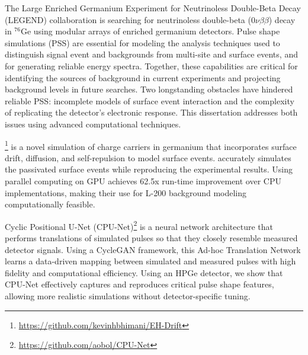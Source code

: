 The Large Enriched Germanium Experiment for Neutrinoless Double-Beta Decay (LEGEND) collaboration is searching for neutrinoless double-beta ({\ensuremath{0\nu\beta\beta}}) decay in ${}^{76}$Ge using modular arrays of enriched germanium detectors. Pulse shape simulations (PSS) are essential for modeling the analysis techniques used to distinguish signal event and backgrounds from multi-site and surface events, and for generating reliable energy spectra. Together, these capabilities are critical for identifying the sources of background in current experiments and projecting background levels in future searches. Two longstanding obstacles have hindered reliable PSS: incomplete models of surface event interaction and the complexity of replicating the detector’s electronic response. This dissertation addresses both issues using advanced computational techniques.

{\ehd} \footnote{\url{https://github.com/kevinhbhimani/EH-Drift}} is a novel simulation of charge carriers in germanium that incorporates surface drift, diffusion, and self-repulsion to model surface events. {\ehd} accurately simulates the passivated surface events while reproducing the experimental results. Using parallel computing on GPU {\ehd} achieves 62.5x run-time improvement over CPU implementations, making their use for L-200 background modeling computationally feasible.

Cyclic Positional U-Net (CPU-Net)\footnote{\url{https://github.com/aobol/CPU-Net}} is a neural network architecture that performs translations of simulated pulses so that they closely resemble measured detector signals. Using a CycleGAN framework, this Ad-hoc Translation Network learns a data-driven mapping between simulated and measured pulses with high fidelity and computational efficiency. Using an HPGe detector, we show that CPU-Net effectively captures and reproduces critical pulse shape features, allowing more realistic simulations without detector-specific tuning.
\clearpage
